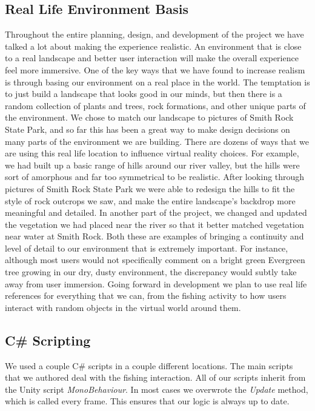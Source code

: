 \documentclass[10pt,journal,compsoc,onecolumn, draftclsnofoot]{IEEEtran}
\begin{document}
\subsection{Real Life Environment Basis}
Throughout the entire planning, design, and development of the project we have talked a lot about making the experience realistic.
An environment that is close to a real landscape and better user interaction will make the overall experience feel more immersive.
One of the key ways that we have found to increase realism is through basing our environment on a real place in the world.
The temptation is to just build a landscape that looks good in our minds, but then there is a random collection of plants and trees, rock formations, and other unique parts of the environment.
We chose to match our landscape to pictures of Smith Rock State Park, and so far this has been a great way to make design decisions on many parts of the environment we are building.
There are dozens of ways that we are using this real life location to influence virtual reality choices.
For example, we had built up a basic range of hills around our river valley, but the hills were sort of amorphous and far too symmetrical to be realistic.
After looking through pictures of Smith Rock State Park we were able to redesign the hills to fit the style of rock outcrops we saw, and make the entire landscape's backdrop more meaningful and detailed.
In another part of the project, we changed and updated the vegetation we had placed near the river so that it better matched vegetation near water at Smith Rock.
Both these are examples of bringing a continuity and level of detail to our environment that is extremely important.
For instance, although most users would not specifically comment on a bright green Evergreen tree growing in our dry, dusty environment, the discrepancy would subtly take away from user immersion.
Going forward in development we plan to use real life references for everything that we can, from the fishing activity to how users interact with random objects in the virtual world around them.

\subsection{C\# Scripting}
We used a couple C\# scripts in a couple different locations. The main scripts that we authored deal with the fishing interaction. All of our scripts inherit from the Unity script \textit{MonoBehaviour}. In most cases we overwrote the \textit{Update} method, which is called every frame. This ensures that our logic is always up to date.
\end{document}

